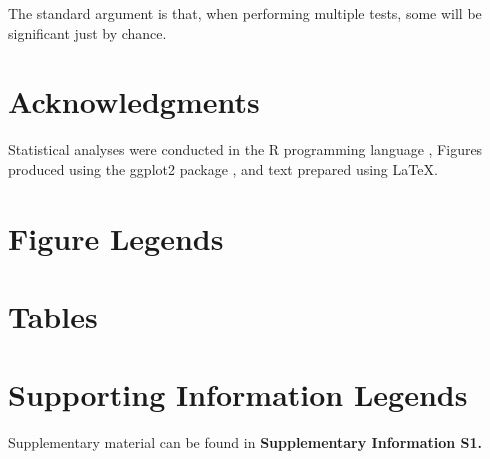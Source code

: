 \documentclass[10pt]{article}
\begin{document}
The standard argument is that,
when performing multiple tests, some will be significant
just by chance.


\section*{Acknowledgments}

Statistical analyses were conducted in the {\sf R} programming language \cite{Rcore:2012}, Figures produced using the ggplot2 package \cite{ggplot2}, and text
prepared using \LaTeX.



\section*{Figure Legends}


\clearpage

\section*{Tables}

\section*{Supporting Information Legends}

Supplementary material can be found in {\bf Supplementary Information S1.}
\end{document}
